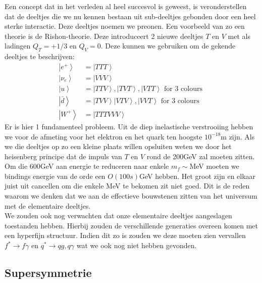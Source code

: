 \documentclass[../main.tex]{subfiles}
\begin{document}
Een concept dat in het verleden al heel succesvol is geweest, is veronderstellen dat de deeltjes die we nu kennen bestaan uit sub-deeltjes gebonden door een heel sterke interactie. Deze deeltjes noemen we preonen. Een voorbeeld van zo een theorie is de Rishon-theorie. Deze introduceert 2 nieuwe deeltjes $T$ en $V$ met als ladingen $Q_{T}=+1 / 3$ en $Q_{V}=0$. Deze kunnen we gebruiken om de gekende deeltjes te beschrijven:
\begin{equation}
    \begin{aligned}
        \label{eq:rischon_samenstelling}
        \left| e^{+}\right>&=\left| T T T\right>\\
        \left| \nu_{e}\right>&=\left| V V V\right>\\
        \left|u\right> &=\left|T T V\right>,\left| T V T\right>, \left| V T T\right>\text { for } 3 \text { colours } \\
        \left| \bar{d}\right>&=\left|T V V\right>\left| V T V\right>, \left| V V T\right>\text { for } 3 \text { colours } \\
        \left|W^{+}\right\rangle &=\left| T T T V V V\right>
    \end{aligned}
\end{equation}
Er is hier 1 fundamenteel probleem. Uit de diep inelastische verstrooiing hebben we voor de afmeting voor het elektron en het quark ten hoogste $10^{-18}$m zijn. Als we die deeltjes op zo een kleine plaats willen opsluiten weten we door het heisenberg principe dat de impuls van $T$ en $V$ rond de 200GeV zal moeten zitten. Om die 600GeV aan energie te reduceren naar enkele $m_f\sim$MeV moeten we bindings energie van de orde een $O(100s)$GeV hebben. Het groot zijn en elkaar juist uit cancellen om die enkele MeV te bekomen zit niet goed. Dit is de reden waarom we denken dat we aan de effectieve bouwstenen zitten van het universum met de elementaire deeltjes.\\
We zouden ook nog verwachten dat onze elementaire deeltjes aangeslagen toestanden hebben. Hierbij zouden de verschillende generaties overeen komen met een hyperfijn structuur. Indien dit zo is zouden we deze moeten zien vervallen $f^{*} \rightarrow f \gamma$ en $q^{*} \rightarrow q g, q \gamma$ wat we ook nog niet hebben gevonden.

\subsection{Supersymmetrie}%
\label{sub:supersymmetrie}
\end{document}
